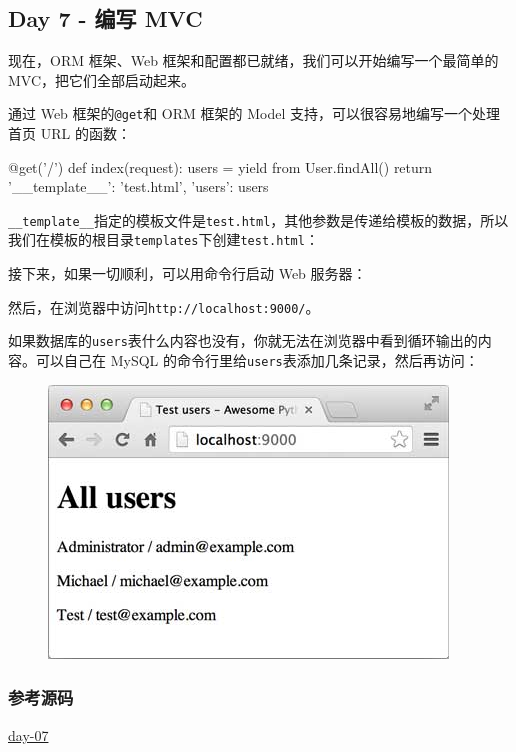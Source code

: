 \hypertarget{day-7---ux7f16ux5199-mvc}{%
\subsection{Day 7 - 编写 MVC}\label{day-7---ux7f16ux5199-mvc}}

现在，ORM 框架、Web 框架和配置都已就绪，我们可以开始编写一个最简单的
MVC，把它们全部启动起来。

通过 Web 框架的\texttt{@get}和 ORM 框架的 Model
支持，可以很容易地编写一个处理首页 URL 的函数：

\begin{pythoncode}
@get('/')
def index(request):
    users = yield from User.findAll()
    return {
        '__template__': 'test.html',
        'users': users
    }
\end{pythoncode}

\texttt{\textquotesingle{}\_\_template\_\_\textquotesingle{}}指定的模板文件是\texttt{test.html}，其他参数是传递给模板的数据，所以我们在模板的根目录\texttt{templates}下创建\texttt{test.html}：


接下来，如果一切顺利，可以用命令行启动 Web 服务器：


然后，在浏览器中访问\texttt{http://localhost:9000/}。

如果数据库的\texttt{users}表什么内容也没有，你就无法在浏览器中看到循环输出的内容。可以自己在
MySQL 的命令行里给\texttt{users}表添加几条记录，然后再访问：

 
 \begin{figure}[htp]
	\centering
	\includegraphics[width=0.6\linewidth]{fig/955624199250624.png}
\end{figure}


\hypertarget{ux53c2ux8003ux6e90ux7801}{%
\subsubsection{参考源码}\label{ux53c2ux8003ux6e90ux7801}}

\href{https://github.com/michaelliao/awesome-python3-webapp/tree/day-07}{day-07}

